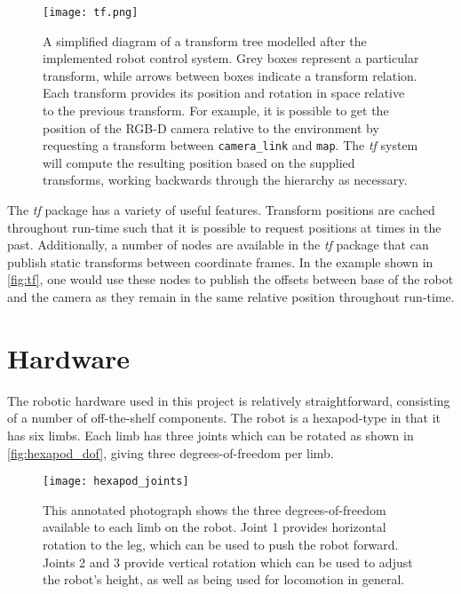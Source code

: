 \begin{figure}[!h]
    \centering
    \texttt{[image: tf.png]}
    \caption{A simplified diagram of a transform tree modelled after the implemented robot control system. Grey boxes represent a particular transform, while arrows between boxes indicate a transform relation. Each transform provides its position and rotation in space relative to the previous transform. For example, it is possible to get the position of the RGB-D camera relative to the environment by requesting a transform between \texttt{camera\_link} and \texttt{map}. The \emph{tf} system will compute the resulting position based on the supplied transforms, working backwards through the hierarchy as necessary.}
    \label{fig:tf_tree}
\end{figure}

The \emph{tf} package has a variety of useful features. Transform positions are cached throughout run-time such that it is possible to request positions at times in the past. Additionally, a number of nodes are available in the \emph{tf} package that can publish static transforms between coordinate frames. In the example shown in \autoref{fig:tf}, one would use these nodes to publish the offsets between base of the robot and the camera as they remain in the same relative position throughout run-time.


\section{Hardware}

The robotic hardware used in this project is relatively straightforward, consisting of a number of off-the-shelf components. The robot is a hexapod-type in that it has six limbs. Each limb has three joints which can be rotated as shown in \autoref{fig:hexapod_dof}, giving three degrees-of-freedom per limb. 

\begin{figure}[!h]
    \centering
    \texttt{[image: hexapod\_joints]}
    \caption{This annotated photograph shows the three degrees-of-freedom available to each limb on the robot. Joint 1 provides horizontal rotation to the leg, which can be used to push the robot forward. Joints 2 and 3 provide vertical rotation which can be used to adjust the robot's height, as well as being used for locomotion in general.}
    \label{fig:hexapod_dof}
\end{figure}

